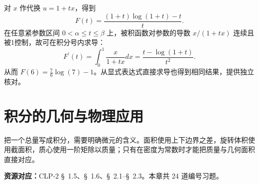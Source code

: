 \documentclass[UTF8,12pt,a4paper,fontset=fandol]{ctexart}
\begin{document}
\begin{solve}\label{ans:c20q24}
对 $x$ 作代换 $u=1+tx$，得到
\[
F(t)=\frac{(1+t)\log(1+t)-t}{t}.
\]
在任意紧参数区间 $0<\alpha\le t\le\beta$ 上，被积函数对参数的导数 $x/(1+tx)$ 连续且被1控制，故可在积分号内求导：
\[
F^{\prime}(t)=\int_0^1\frac{x}{1+tx}dx=\frac{t-\log(1+t)}{t^2}.
\]
从而 $F(6)=\frac{7}{6}\log(7)-1$。从显式表达式直接求导也得到相同结果，提供独立核对。
\end{solve}

\clearpage
\section{积分的几何与物理应用}\label{sec:ch21}
把一个总量写成积分，需要明确微元的含义。面积使用上下边界之差，旋转体积使用截面积，质心使用一阶矩除以质量；只有在密度为常数时才能把质量与几何面积直接对应。

\textbf{资源对应：}CLP-2 \S~1.5、\S~1.6、\S~2.1--\S~2.3。本章共 24 道编号习题。
\end{document}
